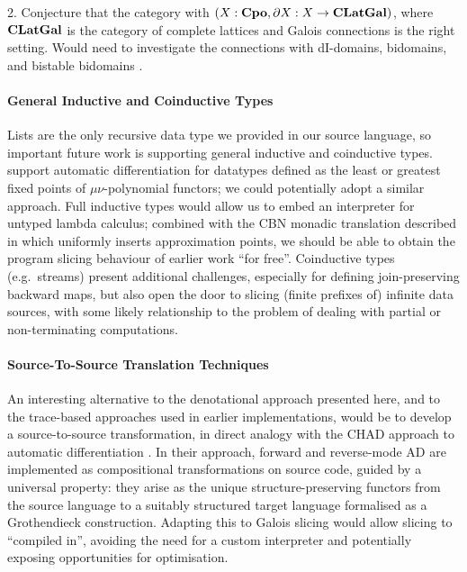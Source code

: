 2. Conjecture that the category with $(X : \mathbf{Cpo}, \partial X : X \to \mathbf{CLatGal})$, where $\mathbf{CLatGal}$ is the category of complete lattices and Galois connections is the right setting. Would need to investigate the connections with dI-domains, bidomains, and bistable bidomains \cite{laird07}.

\paragraph{General Inductive and Coinductive Types}

Lists are the only recursive data type we provided in our source language, so important future work is
supporting general inductive and coinductive types. \citet{nunes2023} support automatic differentiation for
datatypes defined as the least or greatest fixed points of $\mu\nu$-polynomial functors; we could potentially
adopt a similar approach. Full inductive types would allow us to embed an interpreter for untyped lambda
calculus; combined with the CBN monadic translation described in  which uniformly inserts
approximation points, we should be able to obtain the program slicing behaviour of earlier \GPS work ``for
free''. Coinductive types (e.g.~streams) present additional challenges, especially for defining
join-preserving backward maps, but also open the door to slicing (finite prefixes of) infinite data sources,
with some likely relationship to the problem of dealing with partial or non-terminating computations.

\paragraph{Source-To-Source Translation Techniques}


An interesting alternative to the denotational approach presented here, and to the trace-based approaches used
in earlier \GPS implementations, would be to develop a source-to-source transformation, in direct analogy with
the CHAD approach to automatic differentiation \cite{vakar22,nunes2023}. In their approach, forward and
reverse-mode AD are implemented as compositional transformations on source code, guided by a universal
property: they arise as the unique structure-preserving functors from the source language to a suitably
structured target language formalised as a Grothendieck construction. Adapting this to Galois slicing would
allow slicing to ``compiled in'', avoiding the need for a custom interpreter and potentially exposing
opportunities for optimisation.
